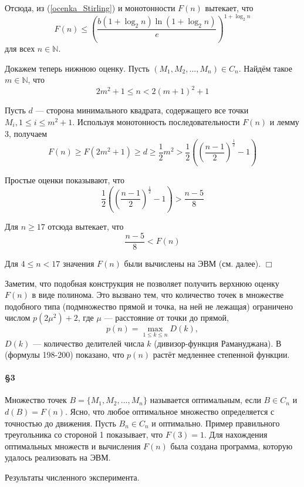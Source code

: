 \documentclass[a4paper,14pt]{article} %
\begin{document}
Отсюда, из (\ref{ocenka_Stirling}) и монотонности $F(n)$ вытекает, что
\begin{equation}\label{ocenka_primoryaly}
	F(n) \leq \left( \frac{b (1+\log_2 n )\ln (1 + \log_2 n)}{e}\right)^{1+\log_2 n}
\end{equation}
для всех $n\in \mathbb{N}$.


Докажем теперь нижнюю оценку.
Пусть $\left(M_1, M_2, ..., M_n\right) \in C_n$.
Найдём такое $m\in \mathbb{N}$, что
$$
2m^2+1 \leq n < 2(m+1)^2 +1
$$

Пусть $d$ --- сторона минимального квадрата, содержащего все точки $M_i, 1\leq i \leq m^2+1$.
Используя монотонность последовательности $F(n)$ и лемму 3, получаем
$$
F(n) \geq F\left(2m^2+1\right)\geq d \geq \frac{1}{2}m^2 > \frac{1}{2}\left(\left(\frac{n-1}{2}\right)^\frac{1}{2} - 1 \right)
$$

Простые оценки показывают, что
$$
\frac{1}{2}\left(\left(\frac{n-1}{2}\right)^\frac{1}{2} -1 \right) > \frac{n-5}{8}
$$

Для $n\geq 17$ отсюда вытекает, что
$$
\frac{n-5}{8}<F(n)
$$

Для $4 \leq n < 17$ значения $F(n)$ были вычислены на ЭВМ (см. далее).
$\Box$


Заметим, что подобная конструкция не позволяет получить верхнюю оценку $F(n)$ в виде полинома.
Это вызвано тем, что количество точек в множестве подобного типа (подмножество прямой и точка, на ней не лежащая) ограничено числом $p(2\mu^2)+2$, где $\mu$ --- расстояние от точки до прямой,
$$
p(n)=\max\limits_{1\leq k \leq n} D(k),
$$
$D(k)$ --- количество делителей числа $k$ (дивизор-функция Рамануджана).
В \cite{Ramanujan} (формулы 198-200) показано, что $p(n)$
растёт медленнее степенной функции.



\paragraph{\S 3}
Множество точек $B=\{M_1, M_2, ..., M_n\}$ называется оптимальным, если $B \in C_n$ и $d(B) = F(n)$.
Ясно, что любое оптимальное множество определяется с точностью до движения.
Пусть $B_n \in C_n$ и оптимально.
Пример правильного треугольника со стороной 1 показывает, что $F(3)=1$.
Для нахождения оптимальных множеств и вычисления $F(n)$ была создана программа, которую удалось реализовать на ЭВМ.


Результаты численного эксперимента.
\end{document}
